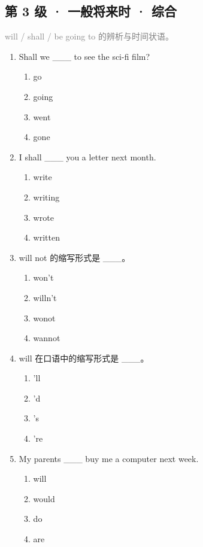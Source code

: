\documentclass[11pt,a4paper]{ctexart}
\begin{document}
\subsection*{第 3 级 · 一般将来时 · 综合}
\noindent\textcolor{gray}{will / shall / be going to 的辨析与时间状语。}\par\smallskip
\begin{enumerate}[leftmargin=*,itemsep=4pt]
\item Shall we \_\_\_ to see the sci-fi film?
\begin{enumerate}[label=\Alph*.,leftmargin=2em,itemsep=1pt,topsep=2pt]
\item go
\item going
\item went
\item gone
\end{enumerate}
\item I shall \_\_\_ you a letter next month.
\begin{enumerate}[label=\Alph*.,leftmargin=2em,itemsep=1pt,topsep=2pt]
\item write
\item writing
\item wrote
\item written
\end{enumerate}
\item will not 的缩写形式是 \_\_\_。
\begin{enumerate}[label=\Alph*.,leftmargin=2em,itemsep=1pt,topsep=2pt]
\item won’t
\item willn’t
\item wonot
\item wannot
\end{enumerate}
\item will 在口语中的缩写形式是 \_\_\_。
\begin{enumerate}[label=\Alph*.,leftmargin=2em,itemsep=1pt,topsep=2pt]
\item ’ll
\item ’d
\item ’s
\item ’re
\end{enumerate}
\item My parents \_\_\_ buy me a computer next week.
\begin{enumerate}[label=\Alph*.,leftmargin=2em,itemsep=1pt,topsep=2pt]
\item will
\item would
\item do
\item are

\end{enumerate}
\end{enumerate}
\end{document}
